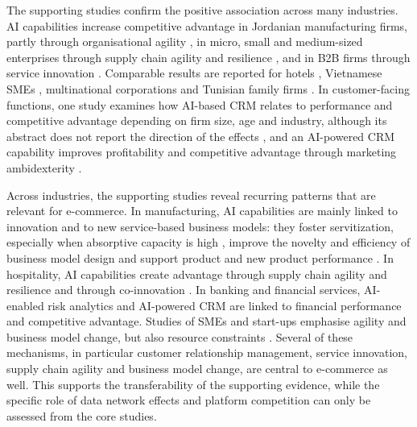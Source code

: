 The supporting studies confirm the positive association across many industries. AI capabilities increase competitive advantage in Jordanian manufacturing firms, partly through organisational agility \parencite[1]{slrR030}, in micro, small and medium-sized enterprises through supply chain agility and resilience \parencite[1]{slrR041}, and in B2B firms through service innovation \parencite[10]{li2025}. Comparable results are reported for hotels \parencite[1]{slrR108}, Vietnamese SMEs \parencite[1]{slrR053}, multinational corporations \parencite[1]{slrR006} and Tunisian family firms \parencite[1]{slrR075}. In customer-facing functions, one study examines how AI-based CRM relates to performance and competitive advantage depending on firm size, age and industry, although its abstract does not report the direction of the effects \parencite[205]{chatterjee2021}, and an AI-powered CRM capability improves profitability and competitive advantage through marketing ambidexterity \parencite[1]{alnofeli2026}.

Across industries, the supporting studies reveal recurring patterns that are relevant for e-commerce. In manufacturing, AI capabilities are mainly linked to innovation and to new service-based business models: they foster servitization, especially when absorptive capacity is high \parencite[1]{slrR017}, improve the novelty and efficiency of business model design \parencite[1]{slrR083} and support product and new product performance \parencites[1]{slrR131}[44]{slrR123}. In hospitality, AI capabilities create advantage through supply chain agility and resilience \parencite[1]{slrR108} and through co-innovation \parencite[2055]{slrR174}. In banking and financial services, AI-enabled risk analytics \parencite[1]{slrR122} and AI-powered CRM \parencite[1]{alnofeli2026} are linked to financial performance and competitive advantage. Studies of SMEs and start-ups emphasise agility and business model change, but also resource constraints \parencites[1]{slrR053}[1]{slrR091}[1]{slrR037}. Several of these mechanisms, in particular customer relationship management, service innovation, supply chain agility and business model change, are central to e-commerce as well. This supports the transferability of the supporting evidence, while the specific role of data network effects and platform competition can only be assessed from the core studies.

